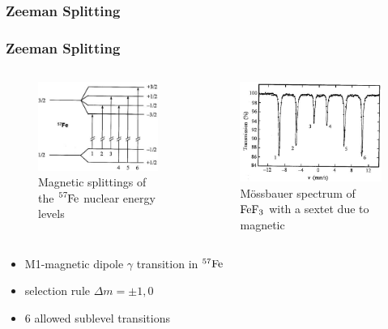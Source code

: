 \subsubsection{Zeeman Splitting}

	\begin{frame}
		\frametitle{Zeeman Splitting}
		
		\begin{columns}
			\begin{column}{0.49\textwidth}
				\begin{figure}
					\centering
					\includegraphics[width=4cm]{images/zeeman-splitting.jpg}
					\caption{Magnetic splittings of the $\ce{^{57}Fe}$ nuclear energy levels}
				\end{figure}
			\end{column}
		
			\begin{column}{0.49\textwidth}
				\begin{figure}
					\centering
					\includegraphics[width=5cm]{images/zeeman-spectrum.jpg}
					\caption{Mössbauer spectrum of $\ce{FeF_3}$ with a sextet due to magnetic}
				\end{figure}
			\end{column}
		\end{columns}
	
		\begin{itemize}
			\item M1-magnetic dipole $\gamma$ transition in $^{57}\ce{Fe}$
			\item selection rule $\Delta m=\pm 1,0$
			\item 6 allowed sublevel transitions
		\end{itemize}
	\end{frame}

